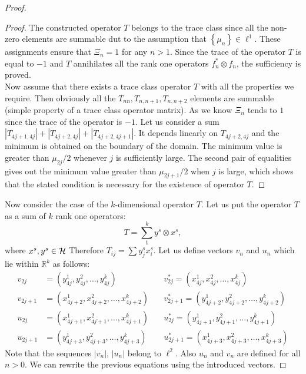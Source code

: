 \documentclass[12pt]{amsart}
\theoremstyle{case}
\begin{document}
\begin{proof}
\begin{proof}
        The constructed operator $T$ belongs to the trace class since all the non-zero elements are summable 
          dut to the assumption that $\left\{\mu_n\right\} \in \ell^1$.
        These assignments ensure that $\Xi_n = 1$ for any $n > 1$.
        Since the trace of the operator $T$ is equal to $-1$ and $T$ annihilates all the rank one operators $f^*_n \otimes f_n$,
          the sufficiency is proved.
        \medskip\\
        Now assume that there exists a trace class operator $T$ with all the properties we require.
        Then obviously all the $T_{nn}, T_{n, n+1}, T_{n, n+2}$ elements are summable (simple property of a trace class operator matrix).
        As we know $\Xi_n$ tends to $1$ since the trace of the operator is $-1$.
        Let us consider a sum $|T_{4j+1, 4j}| + |T_{4j+2,4j}| + |T_{4j+2,4j+1}|$.
        It depends linearly on $T_{4j+2, 4j}$ and the minimum is obtained on the boundary of the domain.
        The minimum value is greater than $\mu_{2j}/2$ whenever $j$ is sufficiently large.
        The second pair of equalities gives out the minimum value greater than $\mu_{2j+1}/2$ when $j$ is large,
          which shows that the stated condition is necessary for the existence of operator $T$.
      \end{proof}
      Now consider the case of the $k$-dimensional operator $T$.
      Let us put the operator $T$ as a sum of $k$ rank one operators:
      \[
        T = \sum_1^k y^s \otimes x^s,
      \]
        where $x^s, y^s \in \cal{H}$
      Therefore $T_{ij} = \sum {y^s_j x^s_i}$.
      Let us define vectors $v_n$ and $u_n$ which lie within $\mathbb{R}^k$ as follows:
      \begin{align*}
        v_{2j} &= (y^1_{4j}, y^2_{4j}, \dots ,y^k_{4j}) \quad
        &v^*_{2j} = (x^1_{4j}, x^2_{4j}, \dots ,x^k_{4j}) \\
        v_{2j+1} &= (x^1_{4j+2}, x^2_{4j+2}, \dots ,x^k_{4j+2}) \quad
        &v^*_{2j+1} = (y^1_{4j+2}, y^2_{4j+2}, \dots ,y^k_{4j+2}) \\
        u_{2j} &= (x^1_{4j+1}, x^2_{4j+1}, \dots ,x^k_{4j+1}) \quad
        &u^*_{2j} = (y^1_{4j+1}, y^2_{4j+1}, \dots ,y^k_{4j+1}) \\
        u_{2j+1} &= (y^1_{4j+3}, y^2_{4j+3}, \dots ,y^k_{4j+3}) \quad
        &u^*_{2j+1} = (x^1_{4j+3}, x^2_{4j+3}, \dots ,x^k_{4j+3}) 
      \end{align*}
      Note that the sequences $|v_n|$, $|u_n|$ belong to $\ell^2$. Also $u_n$ and $v_n$ are defined for all $n > 0$.
      We can rewrite the previous equations using the introduced vectors.

\end{proof}
\end{document}
